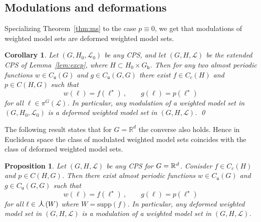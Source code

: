\documentclass[11pt, a4wide]{amsart}
\newcommand{\ts}{\hspace{0.5pt}}
\newcommand{\RR}{\mathbb{R}\ts}
\newcommand{\oplam}{\mbox{\Large $\curlywedge$}}
\newcommand{\cL}{\mathcal L}
\newtheorem{proposition}[lemma]{Proposition}
\newtheorem{corollary}[lemma]{Corollary}
\numberwithin{lemma}{section}
\begin{document}
\subsection{Modulations and deformations}

Specializing Theorem~\ref{thm:ms} to the case $p\equiv0$, we get that modulations of  weighted model sets are deformed weighted model sets.



\begin{corollary}
Let $(G, H_0, \cL_0)$ be any CPS, and let $(G, H, \cL)$ be the extended CPS of Lemma~\ref{lem:excp}, where $H\subset H_0 \times G_\mathsf{b}$. Then for any two almost periodic functions $w\in C_\mathsf{u}(G)$ and $g\in C_\mathsf{u}(G, G)$ there exist $f\in C_c(H)$ and $p \in C(H, G)$ such that
%
\begin{displaymath}
w(\ell)=f(\ell^\star) \ , \qquad  g(\ell)=p(\ell^\star)
\end{displaymath}
%
for all $\ell \in \pi^G(\cL)$.
In particular, any modulation of a weighted model set in $(G,H_0, \cL_0)$ is a deformed weighted model set in $(G,H, \cL)$. \qed
\end{corollary}

The following result states that for $G=\mathbb R^d$ the converse also holds. Hence in Euclidean space the class of modulated weighted model sets coincides with the class of deformed weighted model sets.

\begin{proposition} Let $(G, H, \cL)$ be any CPS for $G=\RR^d$. Conisder $f\in C_c(H)$ and  $p\in C(H,G)$. Then there exist almost periodic functions $w\in C_\mathsf{u}(G)$ and $g\in C_\mathsf{u}(G, G)$ such that
%
\begin{displaymath}
w(\ell)=f(\ell^\star) \ , \qquad  g(\ell)=p(\ell^\star)
\end{displaymath}
%
for all $\ell \in \oplam(W)$ where $W=\mathrm{supp}(f)$. In particular, any deformed weighted model set in $(G,H, \cL)$ is a modulation of a weighted model set in $(G,H, \cL)$.
\end{proposition}
\end{document}
